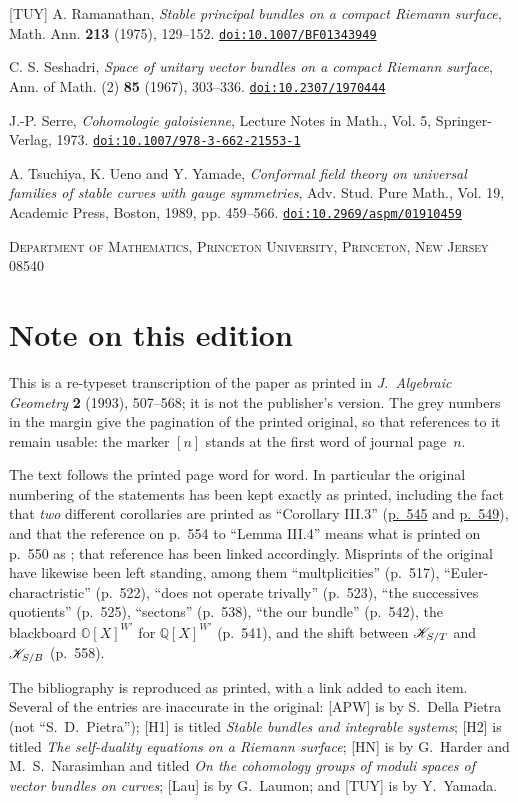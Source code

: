 \documentclass[12pt,english]{smfart}
\theoremstyle{plain} \newtheorem{innerthm}{Theorem} \newtheorem{innerlem}{Lemma} \newtheorem{innerprop}{Proposition} \newtheorem{innercor}{Corollary} \theoremstyle{definition} \newtheorem{innerdefn}{Definition} \newtheorem{innerconstr}{Construction} \theoremstyle{remark} \newtheorem*{remark}{Remark} \newtheorem*{remarks}{Remarks} \newtheorem*{applications}{Applications}
\newcommand{\doi}[1]{{\footnotesize\href{https://doi.org/#1}{\texttt{doi:#1}}}} \newcommand{\doix}[2]{{\footnotesize #1: \href{https://doi.org/#2}{\texttt{doi:#2}}}} \newcommand{\mr}[1]{{\footnotesize\href{https://mathscinet.ams.org/mathscinet-getitem?mr=#1}{\texttt{MR\,#1}}}} \newcommand{\zbl}[1]{{\footnotesize\href{https://zbmath.org/?q=an\%3A#1}{\texttt{Zbl\,#1}}}}
\begin{document}
\begin{thebibliography}{[TUY]}
 A. Ramanathan, \emph{Stable principal bundles on a compact
Riemann surface}, Math. Ann. \textbf{213} (1975), 129--152.
\doi{10.1007/BF01343949}

 C. S. Seshadri, \emph{Space of unitary vector bundles on a
compact Riemann surface}, Ann. of Math. (2) \textbf{85} (1967), 303--336.
\doi{10.2307/1970444}

 J.-P. Serre, \emph{Cohomologie galoisienne}, Lecture Notes
in Math., Vol. 5, Springer-Verlag, 1973.
\doi{10.1007/978-3-662-21553-1}

 A. Tsuchiya, K. Ueno and Y. Yamade, \emph{Conformal field
theory on universal families of stable curves with gauge symmetries}, Adv. Stud. Pure Math., Vol. 19, Academic Press, Boston, 1989, pp. 459--566.
\doi{10.2969/aspm/01910459}

\end{thebibliography}


\textsc{Department of Mathematics, Princeton University, Princeton, New
Jersey 08540}

\clearpage
{}
{}
\section*{Note on this edition}\label{sec:editionnote}

{\small This is a re-typeset transcription of the paper as printed in \emph{J.\ Algebraic Geometry} \textbf{2} (1993), 507--568; it is not the publisher's version. The grey numbers in the margin give the pagination of the printed original, so that references to it remain usable: the marker $[n]$ stands at the first word of journal page~$n$.

The text follows the printed page word for word. In particular the original numbering of the statements has been kept exactly as printed, including the fact that \emph{two} different corollaries are printed as ``Corollary III.3'' (\hyperref[cor:III.3a]{p.~545} and \hyperref[cor:III.3b]{p.~549}), and that the reference on p.~554 to ``Lemma III.4'' means what is printed on p.~550 as ; that reference has been linked accordingly. Misprints of the original have likewise been left standing, among them ``multplicities'' (p.~517), ``Euler-charactristic'' (p.~522), ``does not operate trivally'' (p.~523), ``the successives quotients'' (p.~525), ``sectons'' (p.~538), ``the our bundle'' (p.~542), the blackboard $\mathbb{O}[X]^{W'}$ for $\mathbb{Q}[X]^{W'}$ (p.~541), and the shift between $\mathscr{K}_{S/T}$ and $\mathscr{K}_{S/B}$ (p.~558).

The bibliography is reproduced as printed, with a link added to each item. Several of the entries are inaccurate in the original: [APW] is by S.~Della Pietra (not ``S.~D.\ Pietra''); [H1] is titled \emph{Stable bundles and integrable systems}; [H2] is titled \emph{The self-duality equations on a Riemann surface}; [HN] is by G.~Harder and M.~S.\ Narasimhan and titled \emph{On the cohomology groups of moduli spaces of vector bundles on curves}; [Lau] is by G.~Laumon; and [TUY] is by Y.~Yamada. }
\end{document}
